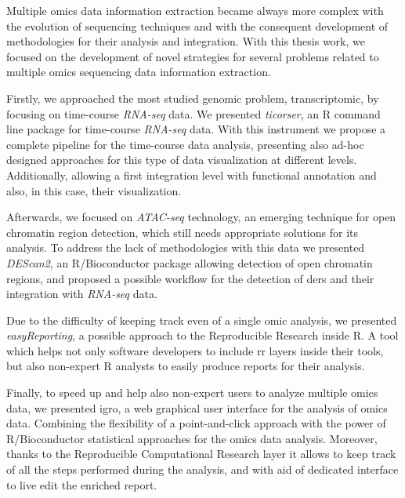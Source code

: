 Multiple omics data information extraction became always more complex with the evolution of sequencing techniques and with the consequent development of methodologies for their analysis and integration.
With this thesis work, we focused on the development of novel strategies for several problems related to multiple omics sequencing data information extraction.

Firstly, we approached the most studied genomic problem, transcriptomic, by focusing on time-course \textit{RNA-seq} data.
We presented \textit{ticorser}, an R command line package for time-course \textit{RNA-seq} data.
With this instrument we propose a complete pipeline for the time-course data analysis, presenting also ad-hoc designed approaches for this type of data visualization at different levels.
Additionally, allowing a first integration level with functional annotation and also, in this case, their visualization.

Afterwards, we focused on \textit{ATAC-seq} technology, an emerging technique for open chromatin region detection, which still needs appropriate solutions for its analysis.
To address the lack of methodologies with this data we presented \textit{DEScan2}, an R/Bioconductor package allowing detection of open chromatin regions, and proposed a possible workflow for the detection of \glspl{der} and their integration with \textit{RNA-seq} data.

Due to the difficulty of keeping track even of a single omic analysis, we presented \textit{easyReporting}, a possible approach to the Reproducible Research inside R.
A tool which helps not only software developers to include \gls{rr} layers inside their tools, but also non-expert R analysts to easily produce reports for their analysis.

Finally, to speed up and help also non-expert users to analyze multiple omics data, we presented \gls{igro}, a web graphical user interface for the analysis of omics data.
Combining the flexibility of a point-and-click approach with the power of R/Bioconductor statistical approaches for the omics data analysis.
Moreover, thanks to the Reproducible Computational Research layer it allows to keep track of all the steps performed during the analysis, and with aid of dedicated interface to live edit the enriched report.